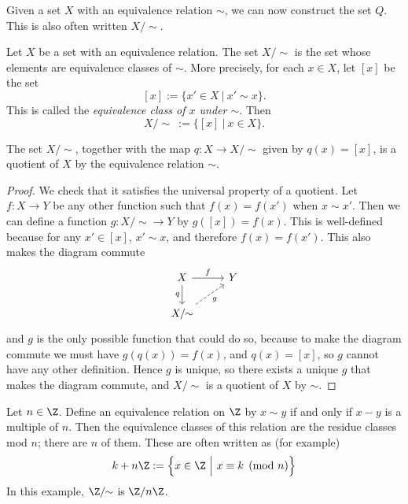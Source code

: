 \documentclass[noname]{notes}
\begin{document}
Given a set $X$ with an equivalence relation $\sim$, we can now construct the set $Q$. This is also often written $X /\!\!\sim$. 

\begin{definition}
	Let $X$ be a set with an equivalence relation. The set $X /\!\!\sim$ is the set whose elements are equivalence classes of $\sim$. More precisely, for each $x \in X$, let $[x]$ be the set 
	\[
		[x] := \Big\{ x' \in X \ \Big\vert\ x' \sim x \Big\}.
	\]
	This is called the \emph{equivalence class of $x$ under $\sim$}. Then 
	\[
		X/\!\!\sim\  := \Big\{ [x] \ \Big\vert\ x \in X\Big\}.
	\]
\end{definition}

\begin{proposition}
	The set $X/\!\!\sim$, together with the map $q \colon X \to X/\!\!\sim$ given by $q(x) = [x]$, is a quotient of $X$ by the equivalence relation $\sim$. 
\end{proposition}

\begin{proof}
	We check that it satisfies the universal property of a quotient. Let $f \colon X \to Y$ be any other function such that $f(x) = f(x')$ when $x \sim x'$. Then we can define a function $g \colon X/\!\!\sim \to Y$ by $g([x]) = f(x)$. This is well-defined because for any $x' \in [x]$, $x' \sim x$, and therefore $f(x) = f(x')$. This also makes the diagram commute
	\[
		\begin{tikzcd}
			X \ar[r, "f"] \ar[d, "q"'] & Y \\
			X/\!\!\sim \ar[ur, dashed, "g"'] 
		\end{tikzcd}
	\]
	and $g$ is the only possible function that could do so, because to make the diagram commute we must have $g(q(x)) = f(x)$, and $q(x) = [x]$, so $g$ cannot have any other definition. Hence $g$ is unique, so there exists a unique $g$ that makes the diagram commute, and $X/\!\!\sim$ is a quotient of $X$ by $\sim$. 
\end{proof}	

\begin{example}
	Let $n \in \Z$. Define an equivalence relation on $\Z$ by $x \sim y$ if and only if $x - y$ is a multiple of $n$. Then the equivalence classes of this relation are the residue classes mod $n$; there are $n$ of them. These are often written as (for example)
	\[
		k + n \Z := \Big\{ x \in \Z \ \Big\vert\ x \equiv k \pmod n\Big\}
	\]
	In this example, $\Z /\!\!\sim$ is $\Z/n\Z$. 
\end{example}
\end{document}
